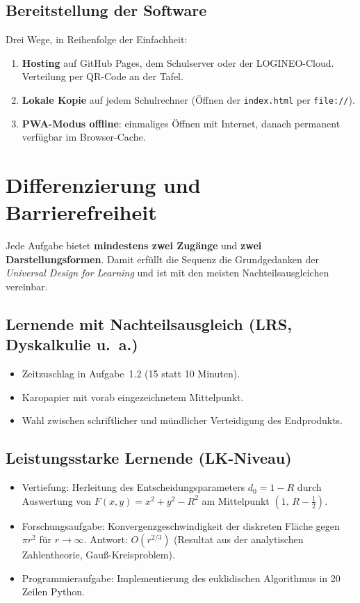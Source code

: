 \documentclass[12pt,a4paper]{scrartcl}
\newcommand{\acc}[1]{\textcolor{accent}{\textbf{#1}}}
\begin{document}
\subsection{Bereitstellung der Software}

Drei Wege, in Reihenfolge der Einfachheit:

\begin{enumerate}[leftmargin=1.5em,itemsep=0.15em,topsep=0.3em]
  \item \textbf{Hosting} auf GitHub Pages, dem Schulserver oder der LOGINEO-Cloud. Verteilung per QR-Code an der Tafel.
  \item \textbf{Lokale Kopie} auf jedem Schulrechner (Öffnen der \texttt{index.html} per \texttt{file://}).
  \item \textbf{PWA-Modus offline}: einmaliges Öffnen mit Internet, danach permanent verfügbar im Browser-Cache.
\end{enumerate}

\section{Differenzierung und Barrierefreiheit}\label{sec:diff}

Jede Aufgabe bietet \acc{mindestens zwei Zugänge} und \acc{zwei Darstellungsformen}. Damit erfüllt die Sequenz die Grundgedanken der \emph{Universal Design for Learning} und ist mit den meisten Nachteilsausgleichen vereinbar.

\subsection{Lernende mit Nachteilsausgleich (LRS, Dyskalkulie u.~a.)}
\begin{itemize}[leftmargin=1.3em,itemsep=0.15em,topsep=0.3em]
  \item Zeitzuschlag in Aufgabe~1.2 (15 statt 10 Minuten).
  \item Karopapier mit vorab eingezeichnetem Mittelpunkt.
  \item Wahl zwischen schriftlicher und mündlicher Verteidigung des Endprodukts.
\end{itemize}

\subsection{Leistungsstarke Lernende (LK-Niveau)}
\begin{itemize}[leftmargin=1.3em,itemsep=0.15em,topsep=0.3em]
  \item Vertiefung: Herleitung des Entscheidungsparameters $d_0 = 1 - R$ durch Auswertung von $F(x, y) = x^2 + y^2 - R^2$ am Mittelpunkt $(1,\, R - \tfrac{1}{2})$.
  \item Forschungsaufgabe: Konvergenzgeschwindigkeit der diskreten Fläche gegen $\pi r^2$ für $r \to \infty$. Antwort: $O(r^{2/3})$ (Resultat aus der analytischen Zahlentheorie, Gauß-Kreisproblem).
  \item Programmieraufgabe: Implementierung des euklidischen Algorithmus in 20 Zeilen Python.
\end{itemize}
\end{document}
